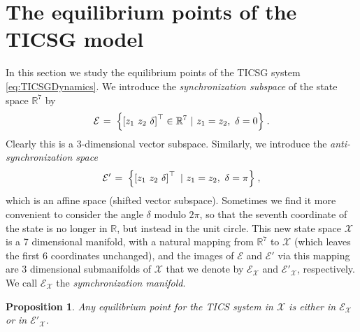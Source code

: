\documentclass[letterpaper,10pt,conference]{ieeeconf}
\newtheorem{proposition}[theorem]{Proposition}
\newcommand{\rline}  {{\mathbb R}}
\newcommand{\m}      {{\hbox{\hskip 1pt}}}
\newcommand{\Emscr}  {{\mathcal{E}}}
\newcommand{\Xmscr}  {{\mathcal{X}}}
\begin{document}
\section{The equilibrium points of the TICSG model} 
\label{sec4} %

In this section we study the equilibrium points of the TICSG
system \eqref{eq:TICSGDynamics}. We introduce the {\em synchronization 
subspace} of the state space $\rline^7$ by
\begin{equation} \label{eq:SyncSubspace}
   \Emscr \m=\m \left\{ \left[z_1 \ z_2 \ \delta \right]^\top\in
   \rline^7 \ |\ z_1=z_2,\ \delta = 0 \right\} \m.
\end{equation}
Clearly this is a 3-dimensional vector subspace. Similarly, we
introduce the {\em anti-synchronization space}
\begin{equation} \label{eq:AntiSyncSubspace}
   \Emscr' \m=\m \left\{ \left[z_1 \ z_2 \ \delta \right]^\top
   \ |\ z_1=z_2,\ \delta = \pi \right\} \m,
\end{equation}
which is an affine space (shifted vector subspace). Sometimes we find
it more convenient to consider the angle $\delta$ modulo $2\pi$, so
that the seventh coordinate of the state is no longer in $\rline$, but
instead in the unit circle. This new state space $\Xmscr$ is a 7
dimensional manifold, with a natural mapping from $\rline^7$ to
$\Xmscr$ (which leaves the first 6 coordinates unchanged), and the
images of $\Emscr$ and $\Emscr'$ via this mapping are 3 dimensional
submanifolds of $\Xmscr$ that we denote by $\Emscr_\Xmscr$ and
$\Emscr'_\Xmscr$, respectively. We call $\Emscr_\Xmscr$ the 
{\em symchronization manifold}.

\begin{proposition} \label{EqPointsProp1}
Any equilibrium point for the TICS system in $\Xmscr$ is either in
$\Emscr_\Xmscr$ or in $\Emscr'_\Xmscr$.
\end{proposition}
\end{document}
